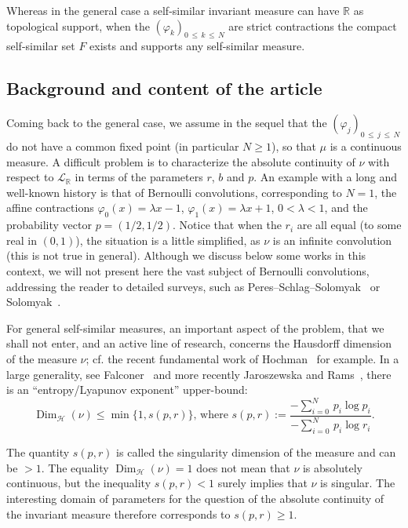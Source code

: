 \documentclass[AHL,Unicode,longabstracts,published]{cedram}
\newcommand{\Rbb}{\mathbb R}
\newcommand{\Lcl}{\mathcal{L}}
\newcommand{\Hcl}{\mathcal{H}}
\DeclareMathOperator{\Dim}{Dim}
\begin{document}
Whereas in the general case a self-similar invariant measure can have $\Rbb$ as topological support, when the $(\varphi_k)_{0\,\leq\,k\,\leq\,N}$ are strict contractions the compact self-similar set $F$ exists and supports any self-similar measure.


\subsection*{Background and content of the article}
Coming back to the general case, we assume in the sequel that the $(\varphi_j)_{0\,\leq\,j\,\leq\,N}$ do not have a common fixed point (in particular $N\geq1$), so that $\mu$ is a continuous measure. A difficult problem is to characterize the absolute continuity of $\nu$ with respect to ${\Lcl}_{\Rbb}$ in terms of the parameters $r$, $b$ and $p$. An example with a long and well-known history is that of Bernoulli convolutions, corresponding to $N=1$, the affine contractions $\varphi_0(x)=\lambda x-1$, $\varphi_1(x)=\lambda x+1$, $0<\lambda<1$, and the probability vector $p=(1/2,1/2)$. Notice that when the $r_i$ are all equal (to some real in $(0,1)$), the situation is a little simplified, as $\nu$ is an infinite convolution (this is not true in general). Although we discuss below some works in this context, we will not present here the vast subject of Bernoulli convolutions, addressing the reader to detailed surveys, such as Peres--Schlag--Solomyak~\cite{sixty} or Solomyak~\cite{solo}.


For general self-similar measures, an important aspect of the problem, that we shall not enter, and an active line of research, concerns the Hausdorff dimension of the measure $\nu$; cf. the recent fundamental work of Hochman~\cite{hochman} for example. In a large generality, see Falconer~\cite{falco} and more recently Jaroszewska and Rams~\cite{rams}, there is an ``entropy/Lyapunov exponent'' upper-bound:
\[
\Dim_{{\Hcl}}(\nu)\leq\min\{1,s(p,r)\}\text{, where }s(p,r):=\frac{-\displaystyle{\sum_{i=0}^N}\,p_i\log p_i}{-\displaystyle{\sum_{i=0}^N}\,p_i\log r_i}.
\]




The quantity $s(p,r)$ is called the singularity dimension of the measure and can be $>1$. The equality $\Dim_{{\Hcl}}(\nu)=1$ does not mean that $\nu$ is absolutely continuous, but the inequality $s(p,r)<1$ surely implies that $\nu$ is singular. The interesting domain of parameters for the question of the absolute continuity of the invariant measure therefore corresponds to $s(p,r)\geq1$.
\end{document}
